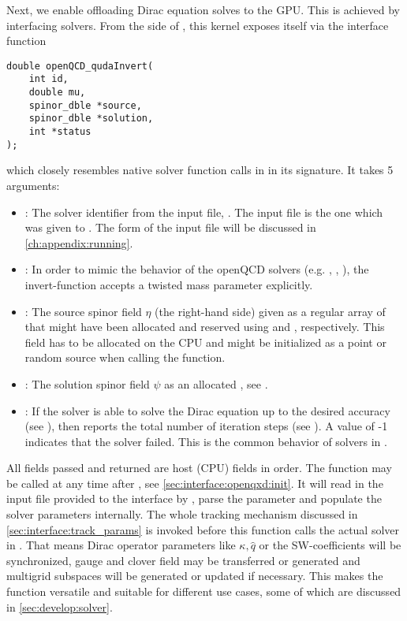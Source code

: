 Next, we enable offloading Dirac equation solves to the GPU.
This is achieved by interfacing \qudas solvers.
From the side of \openqxd, this kernel exposes itself via the interface function
\begin{verbatim}
double openQCD_qudaInvert(
    int id,
    double mu,
    spinor_dble *source,
    spinor_dble *solution,
    int *status
);
\end{verbatim}
which closely resembles native solver function calls in \openqxd in its signature.
It takes \num{5} arguments:
\begin{itemize}
  \item {}: The solver identifier from the input file, \ie {}. The input file is the one which was given to . The form of the input file will be discussed in \cref{ch:appendix:running}.
  \item {}: In order to mimic the behavior of the openQCD solvers (e.g. , , ), the invert-function accepts a twisted mass parameter  explicitly.
  \item {}: The source spinor field $\eta$ (the right-hand side) given as a regular \openqxd array of  that might have been allocated and reserved using  and , respectively. This field has to be allocated on the CPU and might be initialized as a point or random source when calling the function.
  \item {}: The solution spinor field $\psi$ as an allocated , see .
  \item {}: If the solver is able to solve the Dirac equation up to the desired accuracy (see ), then  reports the total number of iteration steps (see ). A value of -1 indicates that the solver failed. This is the common behavior of solvers in \openqxd.
\end{itemize}

All fields passed and returned are host (CPU) fields in \openqxd order.
The function may be called at any time after , see \cref{sec:interface:openqxd:init}.
It will read in the input file provided to the interface by , parse the parameter and populate the solver parameters internally.
The whole tracking mechanism discussed in \cref{sec:interface:track_params} is invoked before this function calls the actual solver in \quda.
That means Dirac operator parameters like $\kappa, \hat{q}$ or the SW-coefficients will be synchronized, gauge and clover field may be transferred or generated and multigrid subspaces will be generated or updated if necessary.
This makes the function versatile and suitable for different use cases, some of which are discussed in \cref{sec:develop:solver}.

